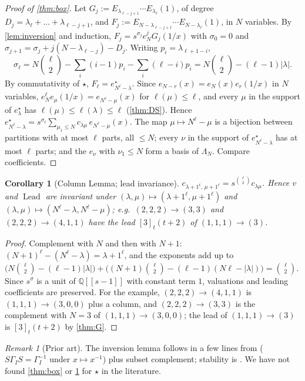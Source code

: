 \documentclass[11pt]{amsart}
\newtheorem{corollary}[theorem]{Corollary}
\theoremstyle{definition}
\theoremstyle{remark}
\newtheorem{remark}[theorem]{Remark}
\numberwithin{equation}{section}
\newcommand{\Lead}{\operatorname{Lead}}
\newcommand{\val}{v}
\newcommand{\Lam}{\Lambda}
\begin{document}
\begin{proof}[Proof of \cref{thm:box}]
Let $G_j:=E_{\lambda_{\ell-j+1}}\cdots E_{\lambda_\ell}(1)$, of degree $D_j=\lambda_\ell+\dots+\lambda_{\ell-j+1}$, and $F_j:=E_{N-\lambda_{\ell-j+1}}\cdots E_{N-\lambda_\ell}(1)$, in $N$ variables. By \cref{lem:inversion} and induction, $F_j=s^{\sigma_j}e_N^jG_j(1/x)$ with $\sigma_0=0$ and $\sigma_{j+1}=\sigma_j+j(N-\lambda_{\ell-j})-D_j$. Writing $p_i=\lambda_{\ell+1-i}$,
\[ \sigma_\ell=N\binom\ell2-\sum_i(i-1)p_i-\sum_i(\ell-i)p_i=N\binom\ell2-(\ell-1)|\lambda| . \]
By commutativity of $\star$, $F_\ell=e^\star_{N^\ell-\lambda}$. Since $e_{N-r}(x)=e_N(x)e_r(1/x)$ in $N$ variables, $e_N^\ell e_\mu(1/x)=e_{N^\ell-\mu}(x)$ for $\ell(\mu)\le\ell$, and every $\mu$ in the support of $e^\star_\lambda$ has $\ell(\mu)\le\ell(\lambda)\le\ell$ (\cref{thm:DS}). Hence $e^\star_{N^\ell-\lambda}=s^{\sigma_\ell}\sum_{\mu_1\le N}c_{\lambda\mu}\,e_{N^\ell-\mu}(x)$. The map $\mu\mapsto N^\ell-\mu$ is a bijection between partitions with at most $\ell$ parts, all $\le N$; every $\nu$ in the support of $e^\star_{N^\ell-\lambda}$ has at most $\ell$ parts; and the $e_\nu$ with $\nu_1\le N$ form a basis of $\Lam_N$. Compare coefficients.
\end{proof}
\begin{corollary}[Column Lemma; lead invariance]\label{cor:column}
$c_{\lambda+1^\ell,\,\mu+1^\ell}=s^{\binom{\ell}{2}}c_{\lambda\mu}$. Hence $\val$ and $\Lead$ are invariant under $(\lambda,\mu)\mapsto(\lambda+1^\ell,\mu+1^\ell)$ and $(\lambda,\mu)\mapsto(N^\ell-\lambda,N^\ell-\mu)$; e.g.\ $(2,2,2)\to(3,3)$ and $(2,2,2)\to(4,1,1)$ have the lead $[3]_t(t+2)$ of $(1,1,1)\to(3)$.
\end{corollary}
\begin{proof}
Complement with $N$ and then with $N+1$: $(N+1)^\ell-(N^\ell-\lambda)=\lambda+1^\ell$, and the exponents add up to $\bigl(N\binom\ell2-(\ell-1)|\lambda|\bigr)+\bigl((N+1)\binom\ell2-(\ell-1)(N\ell-|\lambda|)\bigr)=\binom\ell2$. Since $s^\sigma$ is a unit of $\mathbb{Q}[[s-1]]$ with constant term $1$, valuations and leading coefficients are preserved. For the example, $(2,2,2)\to(4,1,1)$ is $(1,1,1)\to(3,0,0)$ plus a column, and $(2,2,2)\to(3,3)$ is the complement with $N=3$ of $(1,1,1)\to(3,0,0)$; the lead of $(1,1,1)\to(3)$ is $[3]_t(t+2)$ by \cref{thm:G}.
\end{proof}
\begin{remark}[Prior art]
The inversion lemma follows in a few lines from \cite[Rem.~3.3]{DFK19} ($S\Gamma_IS=\Gamma_I^{-1}$ under $x\mapsto x^{-1}$) plus subset complement; stability is \cite[Prop.~3.8, Cor.~3.10]{Hikita25}. We have not found \cref{thm:box} or \cref{cor:column} for $\star$ in the literature.
\end{remark}
\end{document}
